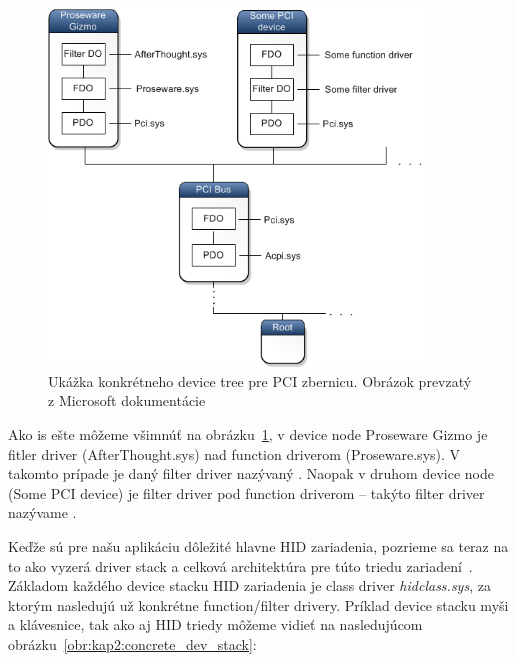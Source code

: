 \begin{itemize}
\begin{figure}[!htb]
	\centering
	\includegraphics[width=10cm]{img/kap02_concrete_dev_tree}
	\caption{Ukážka konkrétneho device tree pre PCI zbernicu. Obrázok prevzatý z Microsoft dokumentácie~\cite{usb_msdn_device_node_stack}}
	\label{obr:kap2:concrete_dev_tree}
\end{figure}

\end{itemize}


Ako is ešte môžeme všimnúť na obrázku~\ref{obr:kap2:concrete_dev_tree}, v device node Proseware Gizmo je fitler driver (AfterThought.sys) nad function driverom (Proseware.sys). V takomto prípade je daný filter driver nazývaný . Naopak v druhom device node (Some PCI device) je filter driver pod function driverom -- takýto filter driver nazývame .

Keďže sú pre našu aplikáciu dôležité hlavne HID zariadenia, pozrieme sa teraz na to ako vyzerá driver stack a celková architektúra pre túto triedu zariadení~\label{kap02:sec:hid_arch}. Základom každého device stacku HID zariadenia je class driver \textit{hidclass.sys}, za ktorým nasledujú už konkrétne function/filter drivery. Príklad device stacku myši a klávesnice, tak ako aj HID triedy môžeme vidieť na nasledujúcom obrázku~\ref{obr:kap2:concrete_dev_stack}:

